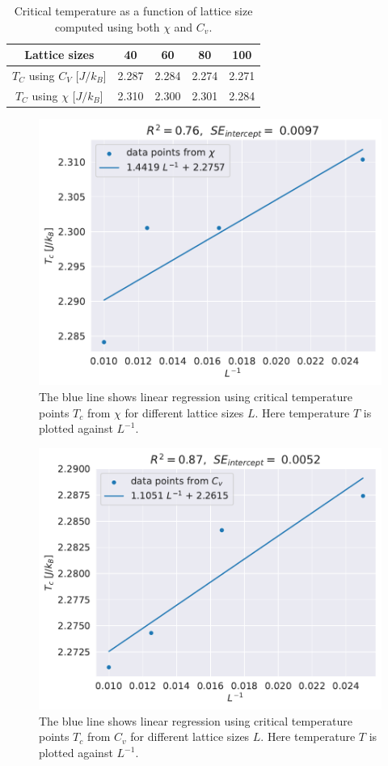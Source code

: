 \documentclass[english,notitlepage,reprint,nofootinbib]{revtex4-1}  %
\begin{document}
\begin{table}
    \centering
    \caption{Critical temperature as a function of lattice size computed using both $\chi$ and $C_v$.}
    \label{tab:critical_T}
    \begin{tabular}{|c|c|c|c|c|}
        \hline
        Lattice sizes                & 40    & 60    & 80    & 100   \\
        \hline
        $T_C$ using $C_V$ [$J/k_B$]  & 2.287 & 2.284 & 2.274 & 2.271 \\
        \hline
        $T_C$ using $\chi$ [$J/k_B$] & 2.310 & 2.300 & 2.301 & 2.284 \\
        \hline
    \end{tabular}
\end{table}
\begin{figure}[H]
    \centering
    \includegraphics[width=.5\textwidth]{../figures/linregress_X.pdf}
    \caption{The blue line shows linear regression using critical temperature points $T_c$ from $\chi$ for different lattice sizes $L$. Here temperature $T$ is plotted against $L^{-1}$.}
    \label{fig:linregress_X}
\end{figure}
\begin{figure}[H]
    \centering
    \includegraphics[width=.5\textwidth]{../figures/linregress_cv.pdf}
    \caption{The blue line shows linear regression using critical temperature points $T_c$ from $C_v$ for different lattice sizes $L$. Here temperature $T$ is plotted against $L^{-1}$.}
    \label{fig:linregress_cv}
\end{figure}
\end{document}
